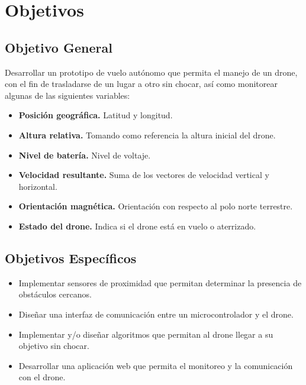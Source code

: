 %

\section{Objetivos}

\subsection{Objetivo General}

Desarrollar un prototipo de vuelo autónomo que permita el manejo de un drone, con el fin de trasladarse de un lugar a otro sin chocar, así como monitorear algunas de las siguientes variables:

\begin{itemize}
	\item \textbf{Posición geográfica.} Latitud y longitud.
	\item \textbf{Altura relativa.} Tomando como referencia la altura inicial del drone.
	\item \textbf{Nivel de batería.} Nivel de voltaje.
	\item \textbf{Velocidad resultante.} Suma de los vectores de velocidad vertical y horizontal.
	\item \textbf{Orientación magnética.} Orientación con respecto al polo norte terrestre.
	\item \textbf{Estado del drone.} Indica si el drone está en vuelo o aterrizado.
\end{itemize}

\subsection{Objetivos Específicos}

\begin{itemize}
	\item Implementar sensores de proximidad que permitan determinar la
		presencia de obstáculos cercanos.
	\item Diseñar una interfaz de comunicación entre un microcontrolador y 
		el drone.
	\item Implementar y/o diseñar algoritmos que permitan al drone llegar a 
		su objetivo sin chocar.
	\item Desarrollar una aplicación web que permita el monitoreo y la
		comunicación con el drone.
\end{itemize}

